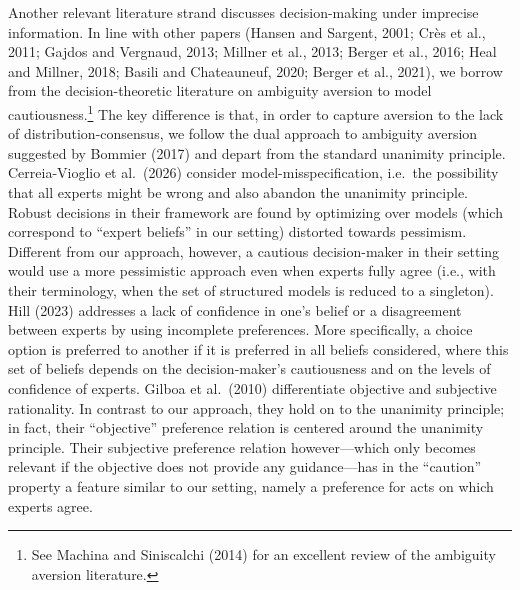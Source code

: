 \documentclass[12pt,a4paper]{article}
\newenvironment{original}
  {\par\noindent\ignorespaces}
  {\par}
\begin{document}
\begin{original}
Another relevant literature strand discusses decision-making under imprecise information. In line with other papers (Hansen and Sargent, 2001; Cr\`{e}s et al., 2011; Gajdos and Vergnaud, 2013; Millner et al., 2013; Berger et al., 2016; Heal and Millner, 2018; Basili and Chateauneuf, 2020; Berger et al., 2021), we borrow from the decision-theoretic literature on ambiguity aversion to model cautiousness.\footnote{See Machina and Siniscalchi (2014) for an excellent review of the ambiguity aversion literature.} The key difference is that, in order to capture aversion to the lack of distribution-consensus, we follow the dual approach to ambiguity aversion suggested by Bommier (2017) and depart from the standard unanimity principle. Cerreia-Vioglio et al.\ (2026) consider model-misspecification, i.e.\ the possibility that all experts might be wrong and also abandon the unanimity principle. Robust decisions in their framework are found by optimizing over models (which correspond to ``expert beliefs'' in our setting) distorted towards pessimism. Different from our approach, however, a cautious decision-maker in their setting would use a more pessimistic approach even when experts fully agree (i.e., with their terminology, when the set of structured models is reduced to a singleton). Hill (2023) addresses a lack of confidence in one's belief or a disagreement between experts by using incomplete preferences. More specifically, a choice option is preferred to another if it is preferred in all beliefs considered, where this set of beliefs depends on the decision-maker's cautiousness and on the levels of confidence of experts. Gilboa et al.\ (2010) differentiate objective and subjective rationality. In contrast to our approach, they hold on to the unanimity principle; in fact, their ``objective'' preference relation is centered around the unanimity principle. Their subjective preference relation however---which only becomes relevant if the objective does not provide any guidance---has in the ``caution'' property a feature similar to our setting, namely a preference for acts on which experts agree.
\end{original}
\end{document}
